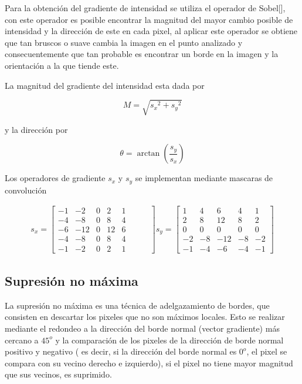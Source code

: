 Para la obtención del gradiente de intensidad se utiliza el operador de Sobel[], con este operador es posible encontrar la magnitud del mayor cambio posible de intensidad y la dirección de este en cada pixel, al aplicar este operador se obtiene que tan bruscos o suave cambia la imagen en el punto analizado y consecuentemente que tan probable es encontrar un borde en la imagen y la orientación a la que tiende este.

La magnitud del gradiente del intensidad esta dada por 

\begin{equation}
M=\sqrt{{s_{x}}^{2}+{s_{y}}^{2}}
\end{equation}

y la dirección por

\begin{equation}
\theta = \arctan\left({\frac{s_{y}}{s_{x}}}\right)
\end{equation} 

Los operadores de gradiente $s_{x}$ y $s_{y}$ se implementan mediante mascaras de convolución 

\begin{equation}
\begin{array}{cclcccl}
s_{x} =\begin{bmatrix}
-1 & -2 & 0 & 2 & 1 \\ 
-4 & -8 & 0 & 8 & 4 \\ 
-6 & -12 & 0 & 12 & 6 \\ 
-4 & -8 & 0 & 8 & 4 \\ 
-1 & -2 & 0 & 2 & 1 &\hspace{1em}&
\end{bmatrix}
s_{y} =\begin{bmatrix}
1 & 4 & 6 & 4 & 1 \\ 
2 & 8 & 12 & 8 & 2 \\ 
0 & 0 & 0 & 0 & 0 \\ 
-2 & -8 & -12 & -8 & -2\\ 
-1 & -4 & -6 & -4 & -1
\end{bmatrix} 
\end{array}
\end{equation}

\subsection{Supresión no máxima}

La supresión no máxima es una técnica de adelgazamiento de bordes, que consisten en descartar los pixeles que no son máximos locales. Esto se realizar mediante el redondeo a la dirección del borde normal (vector gradiente) más cercano a $45^{o}$ y la comparación de los pixeles de la dirección de borde normal positivo y negativo ( es decir, si la dirección del borde normal es $0^{o}$, el pixel se compara con su vecino derecho e izquierdo), si el pixel no tiene mayor magnitud que sus vecinos, es suprimido.


